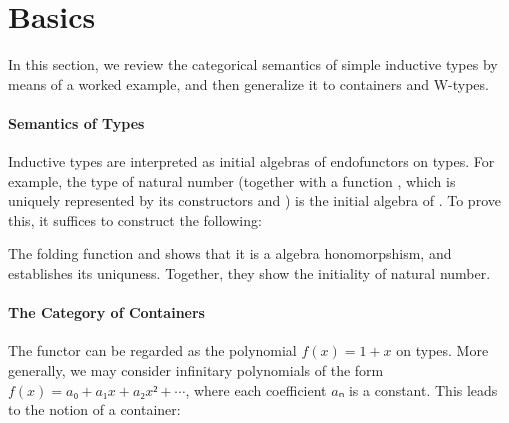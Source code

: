 \section{Basics}
\label{sec:basics}

In this section, we review the categorical semantics of simple inductive types by means of a worked example, and then generalize it to containers and W-types.

\paragraph*{Semantics of Types}

Inductive types are interpreted as initial algebras of endofunctors on types. For example, the type of natural number  (together with a function \AgdaFunction{[z,s]}\;\AgdaSymbol{:}\;\;\;\;, which is uniquely represented by its constructors  and ) is the initial algebra of . To prove this, it suffices to construct the following:



The folding function  and  shows that it is a algebra honomorpshism, and  establishes its uniquness. Together, they show the initiality of natural number.

\paragraph*{The Category of Containers}

The functor  can be regarded as the polynomial $f(x) = 1 + x$ on types. More generally, we may consider infinitary polynomials of the form $f(x) = a₀ + a₁ x + a₂ x² + \cdots$, where each coefficient $aₙ$ is a constant. This leads to the notion of a container:




